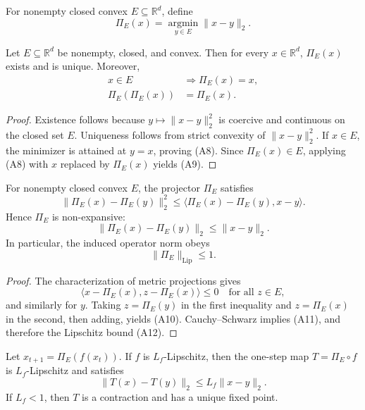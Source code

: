 \documentclass[11pt]{article}
\begin{document}
\begin{definition}
For nonempty closed convex \(E \subseteq \mathbb{R}^d\), define
\[
\Pi_E(x) = \operatorname*{argmin}_{y \in E} \|x-y\|_2. \tag{A7}
\]
\end{definition}

\begin{theorem}
Let \(E \subseteq \mathbb{R}^d\) be nonempty, closed, and convex. Then for every \(x \in \mathbb{R}^d\), \(\Pi_E(x)\) exists and is unique. Moreover,
\begin{align}
x \in E &\Rightarrow \Pi_E(x) = x, \tag{A8}\\
\Pi_E(\Pi_E(x)) &= \Pi_E(x). \tag{A9}
\end{align}
\end{theorem}

\begin{proof}
Existence follows because \(y \mapsto \|x-y\|_2^2\) is coercive and continuous on the closed set \(E\). Uniqueness follows from strict convexity of \(\|x-y\|_2^2\). If \(x \in E\), the minimizer is attained at \(y=x\), proving (A8). Since \(\Pi_E(x) \in E\), applying (A8) with \(x\) replaced by \(\Pi_E(x)\) yields (A9).
\end{proof}

\begin{theorem}
For nonempty closed convex \(E\), the projector \(\Pi_E\) satisfies
\[
\|\Pi_E(x)-\Pi_E(y)\|_2^2 \le \langle \Pi_E(x)-\Pi_E(y), x-y \rangle. \tag{A10}
\]
Hence \(\Pi_E\) is non-expansive:
\[
\|\Pi_E(x)-\Pi_E(y)\|_2 \le \|x-y\|_2. \tag{A11}
\]
In particular, the induced operator norm obeys
\[
\|\Pi_E\|_{\mathrm{Lip}} \le 1. \tag{A12}
\]
\end{theorem}

\begin{proof}
The characterization of metric projections gives
\[
\langle x-\Pi_E(x), z-\Pi_E(x) \rangle \le 0 \quad \text{for all } z \in E, \tag{A13}
\]
and similarly for \(y\). Taking \(z=\Pi_E(y)\) in the first inequality and \(z=\Pi_E(x)\) in the second, then adding, yields (A10). Cauchy--Schwarz implies (A11), and therefore the Lipschitz bound (A12).
\end{proof}

\begin{corollary}
Let \(x_{t+1}=\Pi_E(f(x_t))\). If \(f\) is \(L_f\)-Lipschitz, then the one-step map \(T=\Pi_E\circ f\) is \(L_f\)-Lipschitz and satisfies
\[
\|T(x)-T(y)\|_2 \le L_f\|x-y\|_2. \tag{A14}
\]
If \(L_f < 1\), then \(T\) is a contraction and has a unique fixed point.
\end{corollary}
\end{document}
